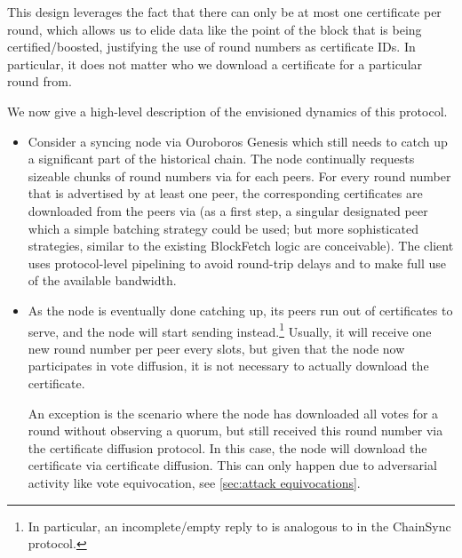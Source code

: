 This design leverages the fact that there can only be at most one certificate per round, which allows us to elide data like the point of the block that is being certified/boosted, justifying the use of round numbers as certificate IDs.
In particular, it does not matter who we download a certificate for a particular round from.

We now give a high-level description of the envisioned dynamics of this protocol.

\begin{itemize}
\item
  Consider a syncing node via Ouroboros Genesis which still needs to catch up a significant part of the historical chain.
  The node continually requests sizeable chunks of round numbers via \MsgRequestObjIdsNB{} for each peers.
  For every round number that is advertised by at least one peer, the corresponding certificates are downloaded from the peers via \MsgRequestObjs{} (as a first step, a singular designated peer which a simple batching strategy could be used; but more sophisticated strategies, similar to the existing BlockFetch logic are conceivable).
  The client uses protocol-level pipelining to avoid round-trip delays and to make full use of the available bandwidth.
\item
  As the node is eventually done catching up, its peers run out of certificates to serve, and the node will start sending \MsgRequestObjIdsB{} instead.\footnote{
  In particular, an incomplete/empty reply to \MsgRequestObjIdsNB{} is analogous to  in the ChainSync protocol.}
  Usually, it will receive one new round number per peer every \perasRoundSlots{} slots, but given that the node now participates in vote diffusion, it is not necessary to actually download the certificate.

  An exception is the scenario where the node has downloaded all votes for a round without observing a quorum, but still received this round number via the certificate diffusion protocol.
  In this case, the node will download the certificate via certificate diffusion.
  This can only happen due to adversarial activity like vote equivocation, see \cref{sec:attack equivocations}.
\end{itemize}

